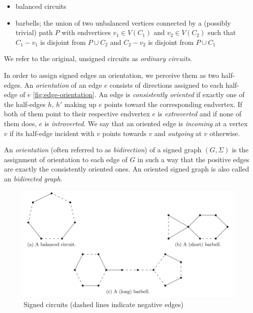 \begin{itemize}
    \item balanced circuits
    \item barbells; the union of two unbalanced vertices connected by a (possibly trivial) path $P$ with endvertices $v_1 \in V(C_1)$ and $v_2 \in V(C_2)$ such that $C_1 - v_1$ is disjoint from $P \cup C_2$ and $C_2 - v_2$ is disjoint from $P \cup C_1$
\end{itemize}

We refer to the original, unsigned circuits as \textit{ordinary circuits}.

In order to assign signed edges an orientation, we perceive them as two half-edges. 
An \textit{orientation} of an edge $e$ consists of directions assigned to each half-edge of $e$ \cref{fig:edge-orientation}.
An edge is \textit{consistently oriented} if exactly one of the half-edges $h$, $h'$ making up $e$ points toward the corresponding endvertex.
If both of them point to their respective endvertex $e$ is \textit{extroverted} and if none of them does, $e$ is \textit{introverted}.
We say that an oriented edge is \textit{incoming} at a vertex $v$ if its half-edge incident with $v$ points towards $v$ and \textit{outgoing} at $v$ otherwise.

An \textit{orientation} (often referred to as \textit{bidirection}) of a signed graph $(G, \Sigma)$ is the assignment of orientation to each edge of $G$ in such a way that the positive edges
are exactly the consistently oriented ones. An oriented signed graph is also called an \textit{bidirected graph}.

\begin{figure}[ht]\label{fig:signed-circuits}
    \centering
    \includegraphics[scale=0.65]{images/signed-circuits.png}
    \caption{Signed circuits (dashed lines indicate negative edges)}
\end{figure}

